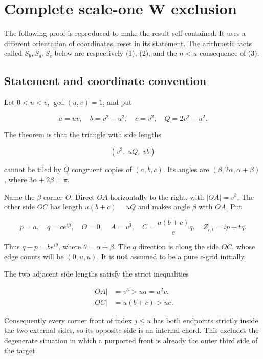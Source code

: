 \documentclass[
  11pt,
  a4paper,
]{article}
\begin{document}
\clearpage
\appendix

\hypertarget{complete-scale-one-w-exclusion}{%
\section{Complete scale-one W
exclusion}\label{complete-scale-one-w-exclusion}}

The following proof is reproduced to make the result self-contained. It
uses a different orientation of coordinates, reset in its statement. The
arithmetic facts called \(S_b,S_a,S_c\) below are respectively (1), (2),
and the \(n<u\) consequence of (3).

\hypertarget{statement-and-coordinate-convention}{%
\subsection{Statement and coordinate
convention}\label{statement-and-coordinate-convention}}

Let \(0<u<v\), \(\gcd(u,v)=1\), and put

\[
a=uv,\quad b=v^2-u^2,\quad c=v^2,\quad Q=2v^2-u^2.
\]

The theorem is that the triangle with side lengths

\[
(v^3,\;uQ,\;vb)
\]

cannot be tiled by \(Q\) congruent copies of \((a,b,c)\). Its angles are
\((\beta,2\alpha,\alpha+\beta)\), where \(3\alpha+2\beta=\pi\).

Name the \(\beta\) corner \(O\). Direct \(OA\) horizontally to the
right, with \(|OA|=v^3\). The other side \(OC\) has length \(u(b+c)=uQ\)
and makes angle \(\beta\) with \(OA\). Put

\[
p=a,\quad q=ce^{i\beta},\quad O=0,\quad A=v^3,\quad
C=\frac{u(b+c)}{c}q,\quad Z_{i,t}=ip+tq.
\]

Thus \(q-p=be^{i\theta}\), where \(\theta=\alpha+\beta\). The \(q\)
direction is along the side \(OC\), whose edge counts will be
\((0,u,u)\). It is \textbf{not} assumed to be a pure \(c\)-grid
initially.

The two adjacent side lengths satisfy the strict inequalities

\[
\begin{aligned}|OA|&=v^3>u a=u^2v,\\
|OC|&=u(b+c)>u c.\end{aligned}\tag{L}
\]

Consequently every corner front of index \(j\le u\) has both endpoints
strictly inside the two external sides, so its opposite side is an
internal chord. This excludes the degenerate situation in which a
purported front is already the outer third side of the target.
\end{document}

